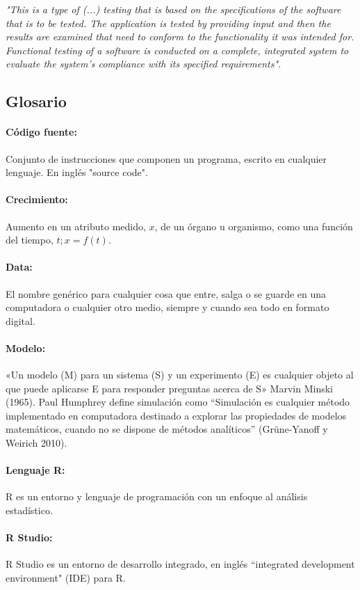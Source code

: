 \textit{"This is a type of (...) testing that is based on the specifications of the software that is to be tested. The application is tested by providing input and then the results are examined that need to conform to the functionality it was intended for. Functional testing of a software is conducted on a complete, integrated system to evaluate the system’s compliance with its specified requirements".}\\

\subsection{Glosario}

\paragraph{C\'odigo fuente:} Conjunto de instrucciones que componen un programa, escrito en cualquier lenguaje. En ingl\'es "source code".
\paragraph{Crecimiento:} Aumento en un atributo medido, $x$, de un \'organo u organismo, como una funci\'on del tiempo, $t;x = f (t)$.
\paragraph{Data:} El nombre gen\'erico para cualquier cosa que entre, salga o se guarde en una computadora o cualquier otro medio, siempre y cuando sea todo en formato digital.
\paragraph{Modelo:} «Un modelo (M) para un sistema (S) y un experimento (E) es cualquier objeto al que puede aplicarse E para responder preguntas acerca de S» Marvin Minski (1965). Paul Humphrey define simulaci\'on como “Simulaci\'on es cualquier m\'etodo implementado en computadora destinado a explorar las propiedades de modelos matem\'aticos, cuando no se dispone de m\'etodos analíticos” (Grüne-Yanoff y Weirich 2010).
\paragraph{Lenguaje R:} R es un entorno y lenguaje de programaci\'on con un enfoque al an\'alisis estad\'istico.
\paragraph{R Studio:} R Studio es un entorno de desarrollo integrado, en ingl\'es ``integrated development environment" (IDE) para R.

